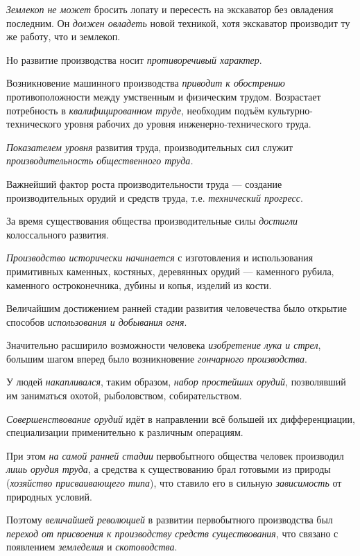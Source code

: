 \documentclass[a4paper,14pt,russian]{extreport}
\begin{document}
\emph{Землекоп не может} бросить лопату и пересесть на экскаватор без овладения последним. Он \emph{должен овладеть} новой техникой, хотя экскаватор производит ту же работу, что и землекоп.

Но развитие производства носит \emph{противоречивый характер}.

Возникновение машинного производства \emph{приводит к обострению} противоположности между умственным и физическим трудом. Возрастает потребность в \emph{квалифицированном труде}, необходим подъём культурно- технического уровня рабочих до уровня инженерно-технического труда.

\emph{Показателем уровня} развития труда, производительных сил служит \emph{производительность общественного труда.}

Важнейший фактор роста производительности труда --- создание производительных орудий и средств труда, т.е. \emph{технический прогресс}.

За время существования общества производительные силы \emph{достигли} колоссального развития.

\emph{Производство исторически начинается} с изготовления и использования примитивных каменных, костяных, деревянных орудий --- каменного рубила, каменного остроконечника, дубины и копья, изделий из кости.

Величайшим достижением ранней стадии развития человечества было открытие способов \emph{использования и добывания огня}.

Значительно расширило возможности человека \emph{изобретение лука и стрел}, большим шагом вперед было возникновение \emph{гончарного производства}.

У людей \emph{накапливался}, таким образом, \emph{набор простейших орудий}, позволявший им заниматься охотой, рыболовством, собирательством.

\emph{Совершенствование орудий} идёт в направлении всё большей их дифференциации, специализации применительно к различным операциям.

При этом \emph{на самой ранней стадии} первобытного общества человек производил \emph{лишь орудия труда}, а средства к существованию брал готовыми из природы (\emph{хозяйство присваивающего типа}), что ставило его в сильную \emph{зависимость} от природных условий.

Поэтому \emph{величайшей революцией} в развитии первобытного производства был \emph{переход от присвоения к производству средств существования}, что связано с появлением \emph{земледелия} и \emph{скотоводства}.
\end{document}
